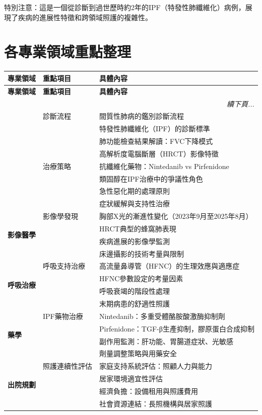 \documentclass{article}
\newcommand{\note}[1]{
    \par
    \noindent
    \begin{tcolorbox}[
        colback=emergency_blue!5!white,
        colframe=emergency_blue,
        title=\textbf{重點提醒},
        fonttitle=\bfseries,
        boxrule=0.5pt,
        arc=3pt,
        left=6pt,
        right=6pt,
        top=6pt,
        bottom=6pt
    ]
    #1
    \end{tcolorbox}
}
\begin{document}
\note{
特別注意：這是一個從診斷到過世歷時約2年的IPF（特發性肺纖維化）病例，展現了疾病的進展性特徵和跨領域照護的複雜性。
}

\section{各專業領域重點整理}

\begin{longtable}{p{3cm} p{4cm} p{8cm}}
\toprule
\textbf{專業領域} & \textbf{重點項目} & \textbf{具體內容} \\
\midrule
\endfirsthead
\toprule
\textbf{專業領域} & \textbf{重點項目} & \textbf{具體內容} \\
\midrule
\endhead
\midrule
\multicolumn{3}{r}{\textit{續下頁...}} \\
\endfoot
\bottomrule
\endlastfoot

\multirow{8}{3cm}{\textbf{內科醫師}} & 診斷流程 & 間質性肺病的鑑別診斷流程 \\
 & & 特發性肺纖維化（IPF）的診斷標準 \\
 & & 肺功能檢查結果解讀：FVC下降模式 \\
 & & 高解析度電腦斷層（HRCT）影像特徵 \\
 & 治療策略 & 抗纖維化藥物：Nintedanib vs Pirfenidone \\
 & & 類固醇在IPF治療中的爭議性角色 \\
 & & 急性惡化期的處理原則 \\
 & & 症狀緩解與支持性治療 \\

\multirow{4}{3cm}{\textbf{影像醫學}} & 影像學發現 & 胸部X光的漸進性變化（2023年9月至2025年8月） \\
 & & HRCT典型的蜂窩肺表現 \\
 & & 疾病進展的影像學監測 \\
 & & 床邊攝影的技術考量與限制 \\

\multirow{4}{3cm}{\textbf{呼吸治療}} & 呼吸支持治療 & 高流量鼻導管（HFNC）的生理效應與適應症 \\
 & & HFNC參數設定的考量因素 \\
 & & 呼吸衰竭的階段性處理 \\
 & & 末期病患的舒適性照護 \\

\multirow{4}{3cm}{\textbf{藥學}} & IPF藥物治療 & Nintedanib：多重受體酪胺酸激酶抑制劑 \\
 & & Pirfenidone：TGF-β生產抑制，膠原蛋白合成抑制 \\
 & & 副作用監測：肝功能、胃腸道症狀、光敏感 \\
 & & 劑量調整策略與用藥安全 \\

\multirow{4}{3cm}{\textbf{出院規劃}} & 照護連續性評估 & 家庭支持系統評估：照顧人力與能力 \\
 & & 居家環境適宜性評估 \\
 & & 經濟負擔：設備租用與照護費用 \\
 & & 社會資源連結：長照機構與居家照護 \\
\end{longtable}
\end{document}
